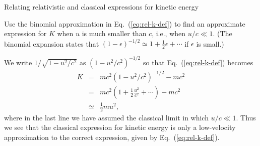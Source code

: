 %    

\begin{example}{Relating relativistic and classical expressions 
for kinetic energy}  

Use the binomial approximation in Eq.~(\ref{eq:rel-k-def}) to find
an approximate expression for $K$ when $u$ is much smaller than
$c$, i.e., when $u/c \ll 1$.  (The binomial expansion states that
$(1-\epsilon)^{-1/2} \simeq 1 + \frac{1}{2}\epsilon + \cdots$ if
$\epsilon$ is small.)

\solution
We write $1/\sqrt{1-u^2/c^2}$ as $(1 - u^2/c^2)^{-1/2}$ so that
Eq.~(\ref{eq:rel-k-def}) becomes
\begin{eqnarray}
K &=& mc^2\left(1-u^2/c^2\right)^{-1/2} - mc^2 \nonumber \\
  &=& mc^2 \left(1 + \frac{1}{2}\frac{u^2}{c^2} + \cdots\right) - mc^2 \\
  &\simeq&  \frac{1}{2}mu^2 \nonumber, 
\end{eqnarray}
where in the last line we have assumed the classical limit in which
$u/c \ll 1$.
Thus we see that the classical expression for kinetic energy is only a
low-velocity approximation to the correct expression, given by
Eq.~(\ref{eq:rel-k-def}).
\end{example}

